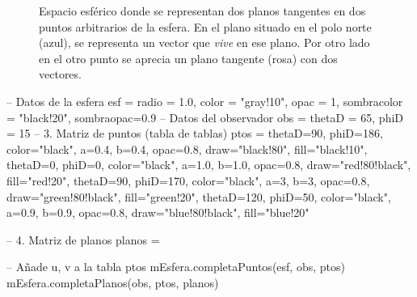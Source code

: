 \begin{figure}[ht]
\begin{tikzpicture}
  \end{tikzpicture}
  \caption{Espacio esférico donde se representan dos planos tangentes en dos puntos
    arbitrarios de la esfera. En el plano situado en el polo norte (azul), se representa
    un vector que \emph{vive} en ese plano. Por otro lado en el otro punto se aprecia
    un plano tangente (rosa) con dos vectores.}
  \label{fig:R2-cart_planos_tangentes}
\end{figure}


\begin{luacode*}
-- Datos de la esfera
  esf = {
    radio = 1.0, color = "gray!10", opac = 1,
    sombracolor = "black!20", sombraopac=0.9
  }
  -- Datos del observador
  obs = {thetaD = 65, phiD = 15}
  -- 3. Matriz de puntos (tabla de tablas)
  ptos = {
    {thetaD=90, phiD=186, color="black", a=0.4, b=0.4, opac=0.8, draw="black!80", fill="black!10"},
    {thetaD=0, phiD=0, color="black", a=1.0, b=1.0, opac=0.8, draw="red!80!black", fill="red!20"},
    {thetaD=90, phiD=170, color="black", a=3, b=3, opac=0.8, draw="green!80!black", fill="green!20"},
    {thetaD=120, phiD=50, color="black", a=0.9, b=0.9, opac=0.8, draw="blue!80!black", fill="blue!20"}
  }
  
-- 4. Matriz de planos
planos = {}
 
-- Añade u, v a la tabla ptos
mEsfera.completaPuntos(esf, obs, ptos)
mEsfera.completaPlanos(obs, ptos, planos)

\end{luacode*}

{\scriptsize
  \par
  \noindent{}\par
  \noindent{}\par
  \noindent{}\par
  \noindent{}\par
  \noindent{}\par
  \noindent{}\par  
}

\begin{figure}[ht]
\end{figure}

